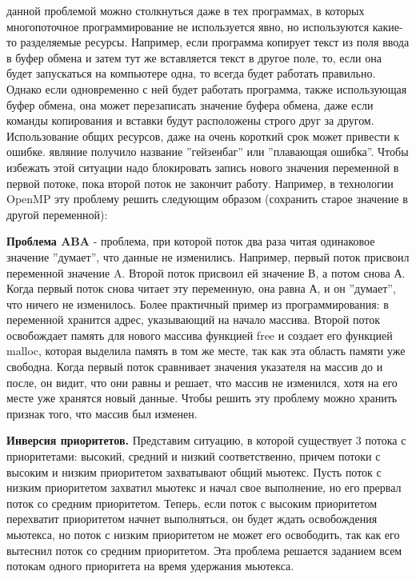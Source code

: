 {	\begin{figure}[H]
		
	\end{figure}
	 данной проблемой можно столкнуться даже в тех программах, в которых многопоточное программирование не используется явно, но используются какие-то разделяемые ресурсы. Например, если программа копирует текст из поля ввода в буфер обмена и затем тут же вставляется текст в другое поле, то, если она будет запускаться на компьютере одна, то всегда будет работать правильно. Однако если одновременно с ней будет работать программа, также использующая буфер обмена, она может перезаписать значение буфера обмена, даже если команды копирования и вставки будут расположены строго друг за другом. Использование общих ресурсов, даже на очень короткий срок может привести к ошибке.
	 являние получило название ''гейзенбаг'' или ''плавающая ошибка''. Чтобы избежать этой ситуации надо блокировать запись нового значения переменной в первой потоке, пока второй поток не закончит работу. Например, в технологии OpenMP эту проблему решить следующим образом (сохранить старое значение в другой переменной):
	\begin{figure}[H]
		
	\end{figure}
	\par\textbf{Проблема ABA} - проблема, при которой поток два раза читая одинаковое значение ''думает'', что данные не изменились. Например, первый поток присвоил переменной значение A. Второй поток присвоил ей значение В, а потом снова А. Когда первый поток снова читает эту переменную, она равна А, и он ''думает'', что ничего не изменилось. Более практичный пример из программирования: в переменной хранится адрес, указывающий на начало массива. Второй поток освобождает память для нового массива функцией free и создает его функцией malloc, которая выделила память в том же месте, так как эта область памяти уже свободна. Когда первый поток сравнивает значения указателя на массив до и после, он видит, что они равны и решает, что массив не изменился, хотя на его месте уже хранятся новый данные. Чтобы решить эту проблему можно хранить признак того, что массив был изменен.
	\par\textbf{Инверсия приоритетов.} Представим ситуацию, в которой существует 3 потока с приоритетами: высокий, средний и низкий соответственно, причем потоки с высоким и низким приоритетом захватывают общий мьютекс. Пусть поток с низким приоритетом захватил мьютекс и начал свое выполнение, но его прервал поток со средним приоритетом. Теперь, если поток с высоким приоритетом перехватит приоритетом начнет выполняться, он будет ждать освобождения мьютекса, но поток с низким приоритетом не может его освободить, так как его вытеснил поток со средним приоритетом. Эта проблема решается заданием всем потокам одного приоритета на время удержания мьютекса.
}
